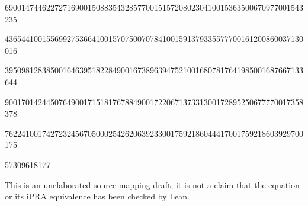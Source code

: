 \documentclass[10pt]{article}
\begin{document}
690014744622727169001508835432857700151572080230410015363500670977001543235\par
436544100155699275366410015707500707841001591379335577700161200860037130016\par
395098128385001646395182284900167389639475210016807817641985001687667133644\par
900170142445076490017151817678849001722067137331300172895250677770017358378\par
762241001742723245670500025426206392330017592186044417001759218603929700175\par
57309618177\par
\endgroup
\par\small This is an unelaborated source-mapping draft; it is not a claim that the equation or its iPRA equivalence has been checked by Lean.
\end{document}
